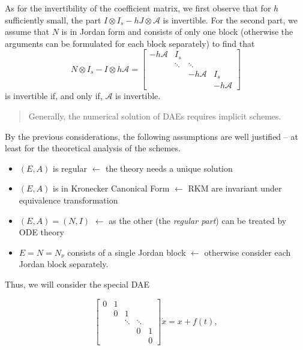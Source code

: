 \documentclass[]{book}
\providecommand{\tightlist}{%
  \setlength{\itemsep}{0pt}\setlength{\parskip}{0pt}}
\newenvironment {JHSAYS} [0] {\begin{quote}\color{jhsc}} {\end{quote}}
\theoremstyle{definition}
\theoremstyle{definition}
\theoremstyle{definition}
\theoremstyle{definition}
\theoremstyle{remark}
\begin{document}
As for the invertibility of the coefficient matrix, we first observe that for \(h\) sufficiently small, the part \(I\otimes I_s - hJ\otimes \mathcal A\) is invertible. For the second part, we assume that \(N\) is in Jordan form and consists of only one block (otherwise the arguments can be formulated for each block separately) to find that
\[
N\otimes I_s - I \otimes h \mathcal A = 
\begin{bmatrix}
-h\mathcal A & I_s \\
& \ddots & \ddots \\
&& -h\mathcal A & I_s \\
&&& -h\mathcal A
\end{bmatrix}
\]
is invertible if, and only if, \(\mathcal A\) is invertible.

\begin{JHSAYS}
Generally, the numerical solution of DAEs requires implicit schemes.
\end{JHSAYS}

By the previous considerations, the following assumptions are well justified -- at least for the theoretical analysis of the schemes.

\begin{itemize}
\tightlist
\item
  \((E,A)\) is regular \(\leftarrow\) the theory needs a unique solution
\item
  \((E,A)\) is in Kronecker Canonical Form \(\leftarrow\) RKM are invariant under equivalence transformation
\item
  \((E,A)=(N,I)\) \(\leftarrow\) as the other (the \emph{regular part}) can be treated by ODE theory
\item
  \(E=N=N_\nu\) consists of a single Jordan block \(\leftarrow\) otherwise consider each Jordan block separately.
\end{itemize}

Thus, we will consider the special DAE

\begin{equation}
\begin{bmatrix}
0 & 1 &        &         &    \\
  & 0 & 1      &         &    \\
  &   & \ddots & \ddots  &    \\
  &   &        & 0       & 1  \\
  &   &        &         & 0 
\end{bmatrix}
\dot x = x + f(t),
\label{eq:spec-dae-rkm-cc}
\end{equation}
\end{document}
